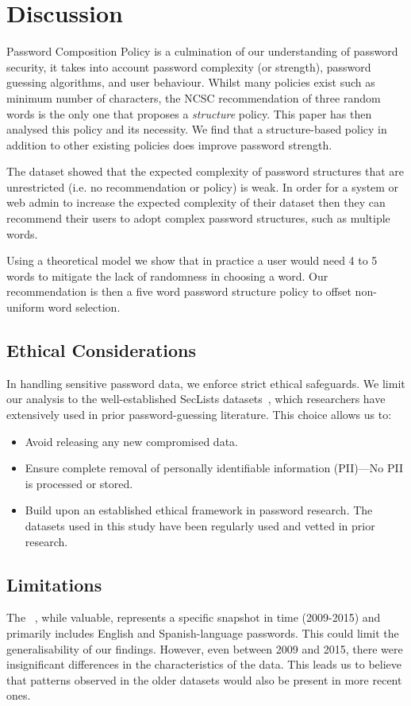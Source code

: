 \section{Discussion}
Password Composition Policy is a culmination of our understanding of password security, it takes into account password complexity (or strength), password guessing algorithms, and user behaviour. Whilst many policies exist such as minimum number of characters, the NCSC recommendation of three random words is the only one that proposes a \textit{structure} policy. This paper has then analysed this policy and its necessity. We find that a structure-based policy in addition to other existing policies does improve password strength.

The \pwdninja dataset showed that the expected complexity of password structures that are unrestricted (i.e. no recommendation or policy) is weak. In order for a system or web admin to increase the expected complexity of their dataset then they can recommend their users to adopt complex password structures, such as multiple words.

Using a theoretical model we show that in practice a user would need 4 to 5 words to mitigate the lack of randomness in choosing a word. Our recommendation is then a five word password structure policy to offset non-uniform word selection.

\subsection{Ethical Considerations}
In handling sensitive password data, we enforce strict ethical safeguards. We limit our analysis to the well-established SecLists datasets~\cite{miessler_danielmiesslerseclists_2024}, which researchers have extensively used in prior password-guessing literature. This choice allows us to:
\begin{itemize}
\item Avoid releasing any new compromised data.
\item Ensure complete removal of personally identifiable information (PII)---No PII is processed or stored.
\item Build upon an established ethical framework in password research. The datasets used in this study have been regularly used and vetted in prior research.
\end{itemize}

\subsection{Limitations}
The \pwdninja~\cite{almasi2024passwordninja}, while valuable, represents a specific snapshot in time (2009-2015) and primarily includes English and Spanish-language passwords. This could limit the generalisability of our findings. However, even between 2009 and 2015, there were insignificant differences in the characteristics of the data. This leads us to believe that patterns observed in the older datasets would also be present in more recent ones.

